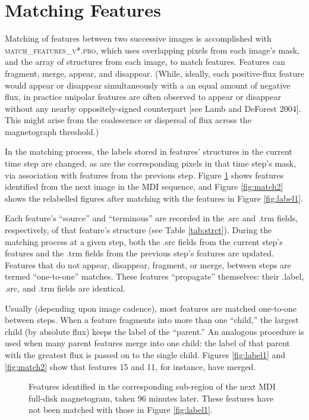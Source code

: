\documentclass[12pt,preprint]{aastex}
\begin{document}
\section{Matching Features}

\noindent
Matching of features between two successive images is accomplished
with \linebreak[4] \textsc{match\_features\_v*.pro}, which uses
overlapping pixels from each image's mask, and the array of structures
from each image, to match features.  Features can fragment, merge,
appear, and disappear.  (While, ideally, each positive-flux feature
would appear or disappear simultaneously with a an equal amount of
negative flux, in practice unipolar features are often observed to
appear or disappear without any nearby oppositely-signed counterpart
[see Lamb and DeForest 2004].  \nocite{Lamb2004}
This might arise from the coalescence or dispersal of flux
across the magnetograph threshold.)

\noindent
In the matching process, the labels stored in features' structures in
the current time step are changed, as are the corresponding pixels
in that time step's mask, via association with features from the
previous step.  Figure \ref{fig:label2} shows features identified from
the next image in the MDI sequence, and Figure \ref{fig:match2} shows
the relabelled figures after matching with the features in Figure
\ref{fig:label1}.

\noindent
Each feature's ``source'' and ``terminous'' are recorded in the .src
and .trm fields, respectively, of that feature's structure (see Table
\ref{tab:strct}).  During the matching process at a given step, both
the .src fields from the current step's features and the .trm fields
from the previous step's features are updated.  Features that do not
appear, disappear, fragment, or merge, between steps are termed
``one-to-one'' matches.  These features ``propagate'' themselves:
their .label, .src, and .trm fields are identical.

\noindent
Usually (depending upon image cadence), most features are matched
one-to-one between steps.  When a feature fragments into more than one
``child,'' the largest child (by absolute flux) keeps the label of the
``parent.''  An analogous procedure is used when many parent features
merge into one child: the label of that parent with the greatest flux
is passed on to the single child.  Figures \ref{fig:label1} and
\ref{fig:match2} show that features 15 and 11, for instance, have
merged.


\begin{figure}
\caption{Features identified in the corresponding sub-region of the
next MDI full-disk magnetogram, taken 96 minutes later.  These
features have not been matched with those in Figure \ref{fig:label1}.
\label{fig:label2}}
\end{figure}
%
\end{document}
